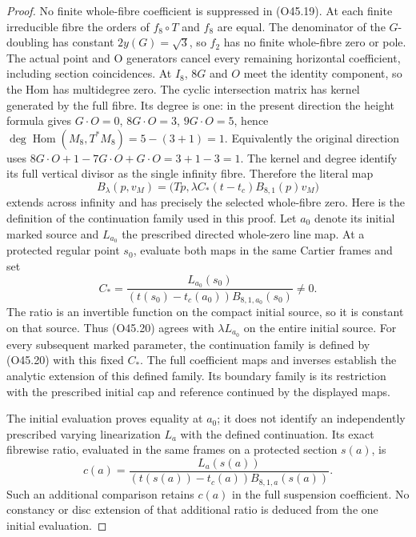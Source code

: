 \begin{proof}
No finite whole-fibre coefficient is suppressed in (O45.19).
At each finite irreducible fibre the orders of \(f_8\circ T\)
and \(f_8\) are equal. The denominator of the \(G\)-doubling
has constant \(2y(G)=\sqrt3\), so \(f_2\) has no finite
whole-fibre zero or pole. The actual point and O generators
cancel every remaining horizontal coefficient, including
section coincidences. At \(I_8\), \(8G\) and \(O\) meet the
identity component, so the Hom has multidegree zero. The
cyclic intersection matrix has kernel generated by the full
fibre. Its degree is one: in the present direction the height
formula gives \(G\cdot O=0\), \(8G\cdot O=3\),
\(9G\cdot O=5\), hence
\(\deg\operatorname{Hom}(M_8,T^*M_8)=5-(3+1)=1\).
Equivalently the original direction uses
\(8G\cdot O+1-7G\cdot O+G\cdot O=3+1-3=1\).
The kernel and degree identify its full vertical divisor as
the single infinity fibre. Therefore the literal map
\[
 B_\lambda(p,v_M)=
 \bigl(Tp,\lambda C_* (t-t_c)B_{8,1}(p)v_M\bigr)
 \tag{O45.20}
\]
extends across infinity and has precisely the selected
whole-fibre zero. Here is the definition of the continuation
family used in this proof. Let \(a_0\) denote its initial marked
source and \(L_{a_0}\) the prescribed directed whole-zero line map.
At a protected regular point \(s_0\), evaluate both maps in the
same Cartier frames and set
\[
 C_*=
 \frac{L_{a_0}(s_0)}
 {(t(s_0)-t_c(a_0))B_{8,1,a_0}(s_0)}\ne0.
\]
The ratio is an invertible function on the compact initial source,
so it is constant on that source. Thus (O45.20) agrees with
\(\lambda L_{a_0}\) on the entire initial source. For every
subsequent marked parameter, the continuation family is defined
by (O45.20) with this fixed \(C_*\). The full coefficient maps
and inverses establish the analytic extension of this defined
family. Its boundary family is its restriction with the prescribed
initial cap and reference continued by the displayed maps.

The initial evaluation proves equality at \(a_0\); it does not
identify an independently prescribed varying linearization
\(L_a\) with the defined continuation. Its exact fibrewise ratio,
evaluated in the same frames on a protected section \(s(a)\), is
\[
 c(a)=\frac{L_a(s(a))}
 {(t(s(a))-t_c(a))B_{8,1,a}(s(a))}.
\]
Such an additional comparison retains \(c(a)\) in the full
suspension coefficient. No constancy or disc extension of that
additional ratio is deduced from the one initial evaluation.


\end{proof}

